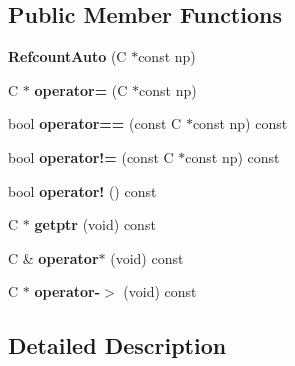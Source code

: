 \subsection*{Public Member Functions}
\begin{DoxyCompactItemize}
\item 
\hypertarget{classGUI_1_1RefcountAuto_af3e2afa0a05bc1710706bdd6939fefa5}{{\bfseries Refcount\-Auto} (C $\ast$const np)}\label{classGUI_1_1RefcountAuto_af3e2afa0a05bc1710706bdd6939fefa5}

\item 
\hypertarget{classGUI_1_1RefcountAuto_ae10fcc09b8b36b0a96db27de50b4357a}{C $\ast$ {\bfseries operator=} (C $\ast$const np)}\label{classGUI_1_1RefcountAuto_ae10fcc09b8b36b0a96db27de50b4357a}

\item 
\hypertarget{classGUI_1_1RefcountAuto_a98532a2b66ecb5381fee570b5079bdd8}{bool {\bfseries operator==} (const C $\ast$const np) const }\label{classGUI_1_1RefcountAuto_a98532a2b66ecb5381fee570b5079bdd8}

\item 
\hypertarget{classGUI_1_1RefcountAuto_a9b7ab837311f70e14154cda5a2f030c9}{bool {\bfseries operator!=} (const C $\ast$const np) const }\label{classGUI_1_1RefcountAuto_a9b7ab837311f70e14154cda5a2f030c9}

\item 
\hypertarget{classGUI_1_1RefcountAuto_a6c2781d6f439139bfc3003f21c4ce04e}{bool {\bfseries operator!} () const }\label{classGUI_1_1RefcountAuto_a6c2781d6f439139bfc3003f21c4ce04e}

\item 
\hypertarget{classGUI_1_1RefcountAuto_a0510239385eaa4ea06410f37f6fbaad4}{C $\ast$ {\bfseries getptr} (void) const }\label{classGUI_1_1RefcountAuto_a0510239385eaa4ea06410f37f6fbaad4}

\item 
\hypertarget{classGUI_1_1RefcountAuto_a02358504117de25d63101b865f98c391}{C \& {\bfseries operator$\ast$} (void) const }\label{classGUI_1_1RefcountAuto_a02358504117de25d63101b865f98c391}

\item 
\hypertarget{classGUI_1_1RefcountAuto_a8728efd920b3b4fd5a4209505643464f}{C $\ast$ {\bfseries operator-\/$>$} (void) const }\label{classGUI_1_1RefcountAuto_a8728efd920b3b4fd5a4209505643464f}

\end{DoxyCompactItemize}


\subsection{Detailed Description}
